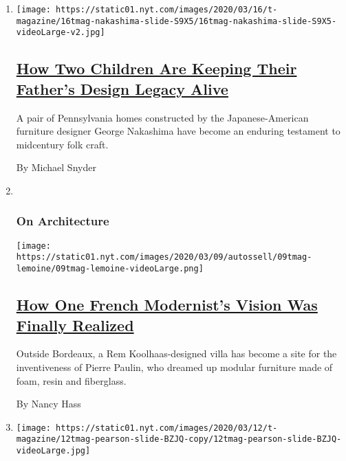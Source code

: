 \begin{enumerate}
\def\labelenumi{\arabic{enumi}.}
\item
  \texttt{[image: https://static01.nyt.com/images/2020/03/16/t-magazine/16tmag-nakashima-slide-S9X5/16tmag-nakashima-slide-S9X5-videoLarge-v2.jpg]}

  \hypertarget{how-two-children-are-keeping-their-fathers-design-legacy-alive}{%
  \subsection{\texorpdfstring{\href{/2020/03/16/t-magazine/george-nakashima-legacy.html}{How
  Two Children Are Keeping Their Father's Design Legacy
  Alive}}{How Two Children Are Keeping Their Father's Design Legacy Alive}}\label{how-two-children-are-keeping-their-fathers-design-legacy-alive}}

  A pair of Pennsylvania homes constructed by the Japanese-American
  furniture designer George Nakashima have become an enduring testament
  to midcentury folk craft.

  By Michael Snyder
\item ~
  \hypertarget{on-architecture}{%
  \subsubsection{On Architecture}\label{on-architecture}}

  \texttt{[image: https://static01.nyt.com/images/2020/03/09/autossell/09tmag-lemoine/09tmag-lemoine-videoLarge.png]}

  \hypertarget{how-one-french-modernists-vision-was-finally-realized}{%
  \subsection{\texorpdfstring{\href{/2020/03/11/t-magazine/rem-koolhaas-pierre-paulin.html}{How
  One French Modernist's Vision Was Finally
  Realized}}{How One French Modernist's Vision Was Finally Realized}}\label{how-one-french-modernists-vision-was-finally-realized}}

  Outside Bordeaux, a Rem Koolhaas-designed villa has become a site for
  the inventiveness of Pierre Paulin, who dreamed up modular furniture
  made of foam, resin and fiberglass.

  By Nancy Hass
\item
  \texttt{[image: https://static01.nyt.com/images/2020/03/12/t-magazine/12tmag-pearson-slide-BZJQ-copy/12tmag-pearson-slide-BZJQ-videoLarge.jpg]}


\end{enumerate}
